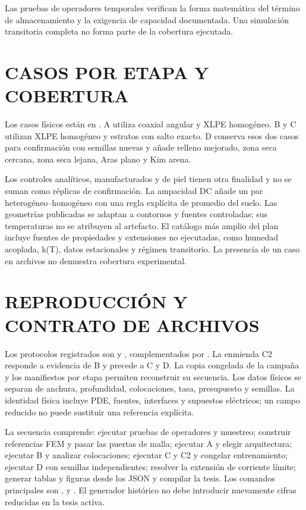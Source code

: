 Las pruebas de operadores temporales verifican la forma matemática del término de almacenamiento y la exigencia de capacidad documentada. Una simulación transitoria completa no forma parte de la cobertura ejecutada.

\section{CASOS POR ETAPA Y COBERTURA}
\label{anx:catalogo-casos}

Los casos físicos están en . A utiliza coaxial angular y XLPE homogéneo. B y C utilizan XLPE homogéneo y estratos con salto exacto. D conserva esos dos casos para confirmación con semillas nuevas y añade relleno mejorado, zona seca cercana, zona seca lejana, Aras plano y Kim arena.

Los controles analíticos, manufacturados y de piel tienen otra finalidad y no se suman como réplicas de confirmación. La ampacidad DC añade un par heterogéneo--homogéneo con una regla explícita de promedio del suelo. Las geometrías publicadas se adaptan a contornos y fuentes controladas; sus temperaturas no se atribuyen al artefacto. El catálogo más amplio del plan incluye fuentes de propiedades y extensiones no ejecutadas, como humedad acoplada, k(T), datos estacionales y régimen transitorio. La presencia de un caso en archivos no demuestra cobertura experimental.

\section{REPRODUCCIÓN Y CONTRATO DE ARCHIVOS}
\label{anx:protocolo-reproduccion}

Los protocolos registrados son  y , complementados por . La enmienda C2 responde a evidencia de B y precede a C y D. La copia congelada de la campaña y los manifiestos por etapa permiten reconstruir su secuencia. Los datos físicos se separan de anchura, profundidad, colocaciones, tasa, presupuesto y semillas. La identidad física incluye PDE, fuentes, interfaces y supuestos eléctricos; un campo reducido no puede sustituir una referencia explícita.

La secuencia comprende: ejecutar pruebas de operadores y muestreo; construir referencias FEM y pasar las puertas de malla; ejecutar A y elegir arquitectura; ejecutar B y analizar colocaciones; ejecutar C y C2 y congelar entrenamiento; ejecutar D con semillas independientes; resolver la extensión de corriente límite; generar tablas y figuras desde los JSON y compilar la tesis. Los comandos principales son ,  y . El generador histórico no debe introducir nuevamente cifras reducidas en la tesis activa.

